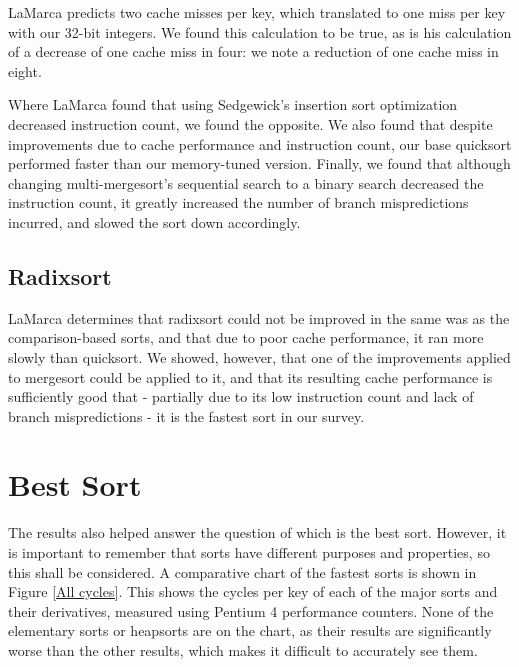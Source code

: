 LaMarca predicts two cache misses per key, which translated to one miss per key
with our 32-bit integers. We found this calculation to be true, as is his
calculation of a decrease of one cache miss in four: we note a reduction of one
cache miss in eight.

Where LaMarca found that using Sedgewick's insertion sort optimization decreased
instruction count, we found the opposite. We also found that despite
improvements due to cache performance and instruction count, our base quicksort
performed faster than our memory-tuned version. Finally, we found that although
changing multi-mergesort's sequential search to a binary search decreased the
instruction count, it greatly increased the number of branch mispredictions
incurred, and slowed the sort down accordingly.


\subsection{Radixsort}

LaMarca determines that radixsort could not be improved in the same was as the
comparison-based sorts, and that due to poor cache performance, it ran more
slowly than quicksort. We showed, however, that one of the improvements applied
to mergesort could be applied to it, and that its resulting cache performance is
sufficiently good that - partially due to its low instruction count and lack of
branch mispredictions - it is the fastest sort in our survey.


\section{Best Sort}

The results also helped answer the question of which is the best sort. However,
it is important to remember that sorts have different purposes and properties,
so this shall be considered. A comparative chart of the fastest sorts is shown
in Figure \vref{All cycles}. This shows the cycles per key of each of the major
sorts and their derivatives, measured using Pentium 4 performance counters.
None of the elementary sorts or heapsorts are on the chart, as their results
are significantly worse than the other results, which makes it difficult to
accurately see them.

